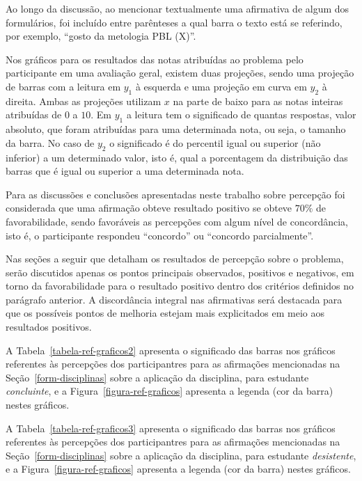 Ao longo da discussão, ao mencionar textualmente uma afirmativa de
algum dos formulários, foi incluído entre parênteses a qual barra o texto
está se referindo, por exemplo, ``gosto da metologia PBL (X)''.

Nos gráficos para os resultados das notas atribuídas
ao problema pelo participante em uma avaliação geral,
existem duas projeções, sendo uma projeção de barras com
a leitura em $y_1$ à esquerda e uma projeção em curva
em $y_2$ à direita.
Ambas as projeções utilizam $x$ na parte de baixo para as notas
inteiras atribuídas de $0$ a $10$.
Em $y_1$ a leitura tem o significado de quantas respostas, valor absoluto,
que foram atribuídas para uma determinada nota, ou seja,
o tamanho da barra.
No caso de $y_2$ o significado é do percentil igual ou superior
(não inferior) a um determinado valor, isto é,
qual a porcentagem da distribuição das barras que é igual ou superior
a uma determinada nota.

Para as discussões e conclusões apresentadas neste trabalho
sobre percepção foi considerada que uma afirmação obteve resultado positivo
se obteve $70\%$ de favorabilidade,
sendo favoráveis as percepções com algum nível de concordância,
isto é, o participante respondeu ``concordo''
ou ``concordo parcialmente''.

Nas seções a seguir que detalham os resultados de percepção sobre o problema, 
serão discutidos apenas os pontos principais observados,
positivos e negativos, em torno da favorabilidade para o
resultado positivo dentro dos critérios
definidos no parágrafo anterior.
A discordância integral nas afirmativas será destacada para que
os possíveis pontos de melhoria estejam mais explicitados em meio
aos resultados positivos.

A Tabela~\ref{tabela-ref-graficos2} apresenta
o significado das barras nos gráficos referentes às percepções
dos participantres para as afirmações mencionadas
na Seção~\ref{form-disciplinas} sobre a aplicação da disciplina,
para estudante \textit{concluinte},
e a Figura~\ref{figura-ref-graficos} apresenta a legenda (cor da barra)
nestes gráficos.



A Tabela~\ref{tabela-ref-graficos3} apresenta
o significado das barras nos gráficos referentes às percepções
dos participantres para as afirmações mencionadas
na Seção~\ref{form-disciplinas} sobre a aplicação da disciplina,
para estudante \textit{desistente},
e a Figura~\ref{figura-ref-graficos} apresenta a legenda (cor da barra)
nestes gráficos.

